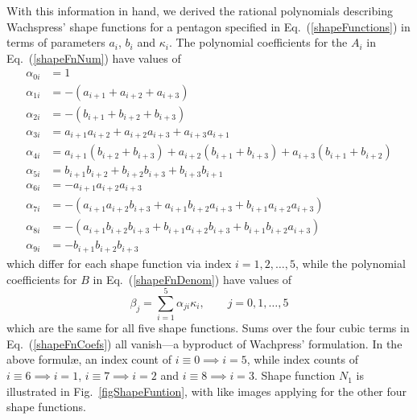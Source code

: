 With this information in hand, we derived the rational polynomials describing Wachspress' shape functions for a pentagon specified in Eq.~(\ref{shapeFunctions}) in terms of parameters $a_i$, $b_i$ and $\kappa_i$.  The polynomial coefficients for the $A_i$ in Eq.~(\ref{shapeFnNum}) have values of
\begin{subequations}
	\label{shapeFnCoefs}
	\begin{align}
	\alpha_{0i} & = 1 \\
	\alpha_{1i} & = -( a_{i+1} + a_{i+2} + a_{i+3} ) \\
	\alpha_{2i} & = -( b_{i+1} + b_{i+2} + b_{i+3} ) \\
	\alpha_{3i} & = a_{i+1} a_{i+2} + a_{i+2} a_{i+3} + a_{i+3} a_{i+1} \\
	\alpha_{4i} & = a_{i+1} ( b_{i+2} + b_{i+3} ) + a_{i+2} ( b_{i+1} + 
	b_{i+3} ) + a_{i+3} ( b_{i+1} + b_{i+2} ) \\
	\alpha_{5i} & = b_{i+1} b_{i+2} + b_{i+2} b_{i+3} + b_{i+3} b_{i+1} \\
	\alpha_{6i} & = -a_{i+1} a_{i+2} a_{i+3} \\
	\alpha_{7i} & = -( a_{i+1} a_{i+2} b_{i+3} + a_{i+1} b_{i+2} a_{i+3} + 
	b_{i+1} a_{i+2} a_{i+3} ) \\
	\alpha_{8i} & = -( a_{i+1} b_{i+2} b_{i+3} + b_{i+1} a_{i+2} b_{i+3} + 
	b_{i+1} b_{i+2} a_{i+3} ) \\
	\alpha_{9i} & = -b_{i+1} b_{i+2} b_{i+3}
	\end{align}
\end{subequations}
which differ for each shape function via index $i = 1,2,\dots,5$, while the polynomial coefficients for $B$ in Eq.~(\ref{shapeFnDenom}) have values of
\begin{equation}
\beta_j = \sum_{i=1}^5 \alpha_{ji} \kappa_i, \qquad j = 0, 1, \dots, 5
\end{equation}
which are the same for all five shape functions.  Sums over the four cubic terms in Eq.~(\ref{shapeFnCoefs}) all vanish---a byproduct of Wachpress' formulation.  In the above formul\ae, an index count of $i \equiv 0 \implies i = 5$, while index counts of $i \equiv 6 \implies i = 1$, $i \equiv 7 \implies i = 2$ and $i \equiv 8 \implies i = 3$.  Shape function $N_1$ is illustrated in Fig.~\ref{figShapeFuntion}, with like images applying for the other four shape functions.

